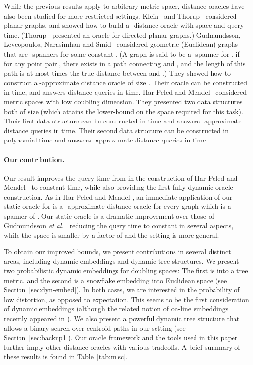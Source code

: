 \documentclass[11pt]{article}
\newcommand{\etal}{{\em et al.\ }}
\begin{document}
While the previous results apply to arbitrary metric space, distance
oracles have also been studied for more restricted settings.
Klein~\cite{Klein02} and Thorup~\cite{Thorup04} considered planar graphs,
and showed how to build a -distance oracle with  space and  query time. (Thorup~\cite{Thorup04}
presented an oracle for directed planar graphs.) Gudmundsson, Levcopoulos,
Narasimhan and Smid~\cite{GuLeNaSm08} considered geometric (Euclidean)
graphs that are -spanners for some constant . (A graph 
is said to be a -spanner for , if for any point pair ,
there exists in  a path connecting  and , and the length of this
path is at most  times the true distance between  and .) They
showed how to construct a -approximate distance oracle of size
. Their oracle can be constructed in
 time, and answers distance queries
in  time. Har-Peled and Mendel~\cite{HaPe06} considered  metric spaces with low doubling dimension. They presented two data structures both of size  (which attains the lower-bound on the space required for this task).
Their first data structure can be constructed in  time and answers -approximate distance queries in  time. Their second data structure can be constructed in polynomial time and answers -approximate distance queries in  time.

\paragraph{Our contribution.}
Our result improves the query time from  in the construction of Har-Peled and Mendel~\cite{HaPe06} to constant time,
while also providing the first fully dynamic oracle construction.
As in Har-Peled and Mendel \cite{HaPe06}, an immediate application of our static oracle for 
is a -approximate distance oracle for every graph which is a
-spanner of . Our static oracle is a dramatic improvement over those 
of Gudmundsson \etal \cite{GuLeNaSm08} reducing the query time to constant in several aspects, 
while the space is smaller by a factor of  and the setting is more general. 

To obtain our improved bounds, we present contributions in several distinct areas, including 
dynamic embeddings and dynamic tree structures. We present two probabilistic dynamic 
embeddings for doubling spaces: The first is into a tree metric, and the second is a 
snowflake embedding into Euclidean space (see Section~\ref{sec:dyn-embed}). In both cases, we 
are interested in the probability of low distortion, as opposed to expectation. This seems to 
be the first consideration of dynamic embeddings (although the related notion of on-line 
embeddings recently appeared in \cite{InMa10}). We also present a powerful dynamic tree 
structure that allows a binary search over centroid paths in our setting (see 
Section~\ref{sec:backup1}). Our oracle framework and the tools used in this paper further 
imply other distance oracles with various tradeoffs. A brief summary of these results is 
found in Table~\ref{tab:misc}.
\end{document}
